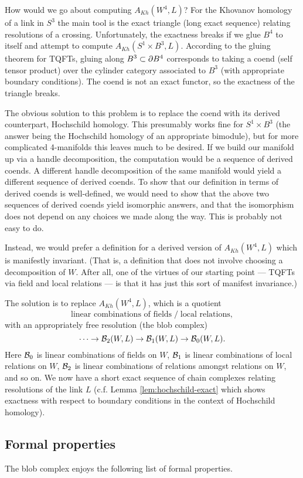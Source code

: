 How would we go about computing $A_{Kh}(W^4, L)$?
For the Khovanov homology of a link in $S^3$ the main tool is the exact triangle (long exact sequence)
relating resolutions of a crossing.
Unfortunately, the exactness breaks if we glue $B^4$ to itself and attempt
to compute $A_{Kh}(S^1\times B^3, L)$.
According to the gluing theorem for TQFTs, gluing along $B^3 \subset \partial B^4$
corresponds to taking a coend (self tensor product) over the cylinder category
associated to $B^3$ (with appropriate boundary conditions).
The coend is not an exact functor, so the exactness of the triangle breaks.

The obvious solution to this problem is to replace the coend with its derived counterpart, 
Hochschild homology.
This presumably works fine for $S^1\times B^3$ (the answer being the Hochschild homology
of an appropriate bimodule), but for more complicated 4-manifolds this leaves much to be desired.
If we build our manifold up via a handle decomposition, the computation
would be a sequence of derived coends.
A different handle decomposition of the same manifold would yield a different
sequence of derived coends.
To show that our definition in terms of derived coends is well-defined, we
would need to show that the above two sequences of derived coends yield 
isomorphic answers, and that the isomorphism does not depend on any
choices we made along the way.
This is probably not easy to do.

Instead, we would prefer a definition for a derived version of $A_{Kh}(W^4, L)$
which is manifestly invariant.
(That is, a definition that does not
involve choosing a decomposition of $W$.
After all, one of the virtues of our starting point --- TQFTs via field and local relations ---
is that it has just this sort of manifest invariance.)

The solution is to replace $A_{Kh}(W^4, L)$, which is a quotient
\[
 \text{linear combinations of fields} \;\big/\; \text{local relations} ,
\]
with an appropriately free resolution (the blob complex)
\[
	\cdots\to {\mathcal B}_2(W, L) \to {\mathcal B}_1(W, L) \to {\mathcal B}_0(W, L) .
\]
Here ${\mathcal B}_0$ is linear combinations of fields on $W$,
${\mathcal B}_1$ is linear combinations of local relations on $W$,
${\mathcal B}_2$ is linear combinations of relations amongst relations on $W$,
and so on. We now have a short exact sequence of chain complexes relating resolutions of the link $L$ (c.f. Lemma \ref{lem:hochschild-exact} which shows exactness with respect to boundary conditions in the context of Hochschild homology).


\subsection{Formal properties}
\label{sec:properties}
The blob complex enjoys the following list of formal properties.

